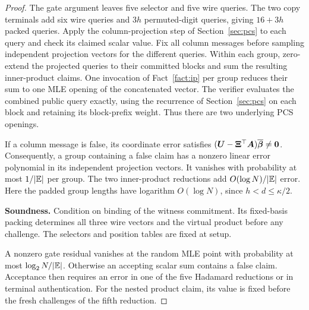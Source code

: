 \begin{proof}
The gate argument leaves five selector and five wire queries.
The two copy terminals add six wire queries and \(3h\)
permuted-digit queries, giving \(16+3h\) packed queries.
Apply the column-projection step of Section~\ref{sec:pcs}
to each query and check its claimed scalar value.
Fix all column messages before sampling independent projection
vectors for the different queries.
Within each group, zero-extend the projected queries to their
committed blocks and sum the resulting inner-product claims.
One invocation of Fact~\ref{fact:ip} per group reduces their
sum to one MLE opening of the concatenated vector.
The verifier evaluates the combined public query exactly,
using the recurrence of Section~\ref{sec:pcs} on each block
and retaining its block-prefix weight.
Thus there are two underlying PCS openings.

If a column message is false, its coordinate error satisfies
\((\bm U-\bm\Xi^\top\bm A)\overline{\bm\beta}\neq\bm0\).
Consequently, a group containing a false claim has a nonzero
linear error polynomial in its independent projection vectors.
It vanishes with probability at most
\(1/|\mathbb{E}|\) per group.
The two inner-product reductions add
\(O(\log N)/|\mathbb{E}|\) error.
Here the padded group lengths have logarithm \(O(\log N)\),
since \(h<d\leq\kappa/2\).

\smallskip\noindent\textbf{Soundness.}
Condition on binding of the witness commitment.
Its fixed-basis packing determines all three wire vectors
and the virtual product before any challenge.
The selectors and position tables are fixed at setup.

A nonzero gate residual vanishes at the random MLE point with
probability at most \(\log_2N/|\mathbb{E}|\).
Otherwise an accepting scalar sum contains a false claim.
Acceptance then requires an error in one of the five Hadamard
reductions or in terminal authentication.
For the nested product claim, its value is fixed before the
fresh challenges of the fifth reduction.


\end{proof}
